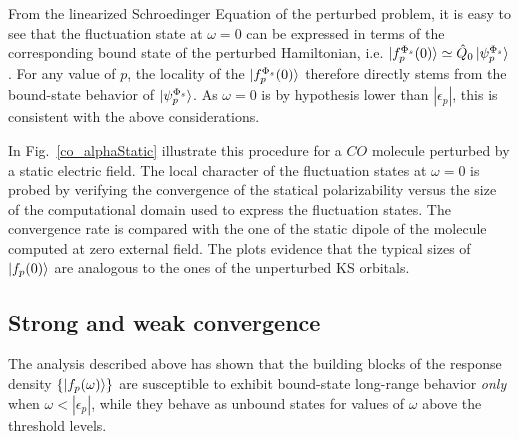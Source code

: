 \documentclass[reprint,aps,prb]{revtex4-1}
\newcommand{\eps}{\epsilon}
\newcommand{\op}[1]{\hat {#1}}
\newcommand{\dmnot}{\op{\rho}_0}
\begin{document}
From the linearized Schroedinger Equation of the perturbed problem, it is easy to see that the fluctuation state at $\omega=0$ can be expressed
in terms of the corresponding bound state of the perturbed Hamiltonian, i.e.
$\ket{f_p^{\Phi_s}(0)} \simeq \op Q_0 \ket{\psi_p^{\Phi_s}}$.
For any value of $p$, the locality of the $\ket{f_p^{\Phi_s}(0)}$ therefore directly stems from the
bound-state behavior of $\ket{\psi_p^{\Phi_s}}$. As $\omega=0$ is by hypothesis 
lower than $|\eps_p|$, this is consistent with the above considerations.

In Fig.~\eqref{co_alphaStatic} illustrate this procedure for a $CO$ molecule 
perturbed by a static electric field. The local character of the fluctuation states at $\omega=0$ is 
probed by verifying the convergence of the statical polarizability versus 
the size of the computational domain used to express the fluctuation states. The convergence rate is compared with the 
one of the static dipole of the molecule computed at zero external field. 
The plots evidence that the typical sizes of $\ket{f_p(0)}$ are analogous to the ones of the unperturbed KS orbitals. 

\subsection{Strong and weak convergence}

The analysis described above has shown that the building blocks of the response density $\{\ket{f_p(\omega)}\}$ 
are susceptible to exhibit bound-state long-range behavior \emph{only} when $\omega < |\eps_p|$, 
while they behave as unbound states for values of $\omega$ above the threshold levels.
\end{document}
